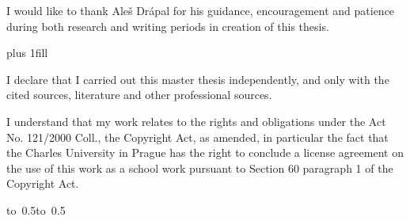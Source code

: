 \documentclass[12pt,a4paper]{report}
\let\openright=\clearpage
\begin{document}
\newpage



\openright

\noindent
I would like to thank Aleš Drápal for his guidance, encouragement and patience during both research and writing periods in creation of this thesis.

\newpage


\vglue 0pt plus 1fill

\noindent
I declare that I carried out this master thesis independently, and only with the cited
sources, literature and other professional sources.

\medskip\noindent
I understand that my work relates to the rights and obligations under the Act No.
121/2000 Coll., the Copyright Act, as amended, in particular the fact that the Charles
University in Prague has the right to conclude a license agreement on the use of this
work as a school work pursuant to Section 60 paragraph 1 of the Copyright Act.

\vspace{10mm}

\hbox{\hbox to 0.5\hbox to 0.5}

\vspace{20mm}
\newpage

\end{document}
